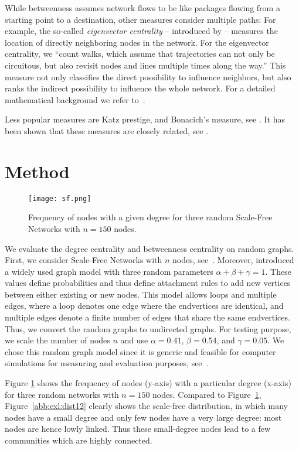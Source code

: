 While betweenness assumes network flows to be like packages flowing from a starting point to a destination, other measures consider multiple paths: For example, the so-called \emph{eigenvector centrality} -- introduced by \cite{bonacich1972factoring} -- measures the location of directly neighboring nodes in the network. For the 
eigenvector centrality, we ``count walks, which assume that trajectories can not only be circuitous, but also revisit nodes and lines multiple times along the way.''\cite{borgatti2005centrality} This measure not only classifies the direct possibility to influence neighbors, but also ranks the indirect possibility to influence the whole network. For a detailed mathematical background we refer to~\cite{Jackson2010}.

Less popular measures are Katz prestige, and Bonacich’s measure, see \cite{Jackson2010}. It has been shown that these measures are closely related, see \cite{ditsworth2019community}.

\section{Method}

\begin{figure}[t] %
	\centering
	\texttt{[image: sf.png]}
	\caption{Frequency of nodes with a given degree for three random Scale-Free Networks with $n=150$ nodes. }
	\label{img:fd1}
\end{figure}

We evaluate the degree centrality and betweenness centrality on random graphs. First, we consider Scale-Free Networks with $n$ nodes, 
see~\cite{Jackson2010}. Moreover, \cite{bollobas2003directed} introduced a widely used graph model with 
three random parameters $\alpha+\beta+\gamma=1$. 
These values define probabilities and thus define attachment rules to add new vertices between either existing or new nodes. This model allows loops and multiple edges, where a loop denotes one edge where the endvertices are identical, and multiple edges denote a finite number of edges 
that share the same endvertices. Thus, we convert the random graphs to undirected graphs. For testing purpose, we scale the number of nodes $n$ and use 
$\alpha=0.41$, $\beta=0.54$, and $\gamma=0.05$.
We chose this random graph model since it is generic and feasible for computer simulations for measuring and evaluation purposes, 
see~\cite{bollobas2003mathematical,kivela2014multilayer}. 

Figure \ref{img:fd1} shows the frequency of nodes (y-axis) with a particular degree (x-axis) for three random networks with $n=150$ nodes. 
Compared to Figure~\ref{img:fd1}, Figure~\ref{abb:exl:dist12} clearly shows the scale-free distribution, in which many nodes have a small degree and only few 
nodes have a very large degree: most nodes are hence lowly linked. Thus these small-degree nodes lead to a few communities which are highly connected.

